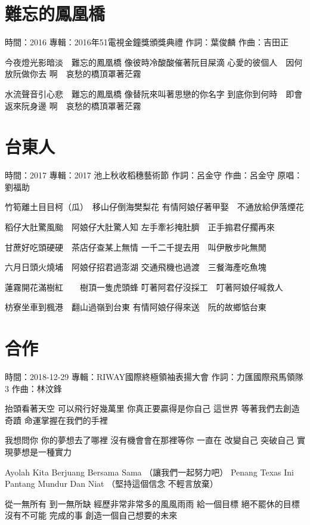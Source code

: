 \documentclass[UTF8,a4paper,oneside,twocolumn,12pt]{ctexbook}
\newcommand{\infopair}[2]{\textbullet #1：#2}
\newcommand{\zc}[1][伍佰]{\infopair{作詞}{#1}}
\newcommand{\zq}[1][伍佰]{\infopair{作曲}{#1}}
\newcommand{\zj}[1]{\infopair{專輯}{#1}}
\newcommand{\yc}[1]{\infopair{原唱}{#1}}
\newcommand{\sj}[1]{\infopair{時間}{#1}}
\newenvironment{info}{\begin{flushleft}\kaishu
	}
	{\end{flushleft}\normalsize\yahei\par}
\newenvironment{lyric}{
	}
{}
\begin{document}
\section{難忘的鳳凰橋}
\begin{info}
	\sj{2016}
	\zj{2016年51電視金鐘獎頒獎典禮}
	\zc[葉俊麟]
	\zq[吉田正]
\end{info}
\begin{lyric}
	今夜燈光影暗淡　難忘的鳳凰橋
	像彼時冷酸酸催著阮目屎滴
	心愛的彼個人　因何放阮做你去
	啊　哀愁的橋頂罩著茫霧

	水流聲音引心悲　難忘的鳳凰橋
	像替阮來叫著思戀的你名字
	到底你到何時　即會返來阮身邊
	啊　哀愁的橋頂罩著茫霧
\end{lyric}

\section{台東人}
\begin{info}
	\sj{2017}
	\zj{2017 池上秋收稻穗藝術節}
	\zc[呂金守]
	\zq[呂金守]
	\yc{劉福助}
\end{info}
\begin{lyric}
	竹筍離土目目柯（瓜）　移山仔倒海樊梨花
	有情阿娘仔著甲娶　不通放給伊落煙花

	稻仔大肚驚風颱　阿娘仔大肚驚人知
	左手牽衫掩肚臍　正手搧君仔擱再來

	甘蔗好吃頭硬硬　茶店仔查某上無情
	一千二千提去用　叫伊散步叱無閒

	六月日頭火燒埔　阿娘仔招君過澎湖
	交通飛機也過渡　三餐海產吃魚塊

	蓮霧開花滿樹紅　　樹頂一隻虎頭蜂
	叮著阿君仔沒採工　叮著阿娘仔喊救人

	枋寮坐車到楓港　翻山過嶺到台東
	有情阿娘仔得來送　阮的故鄉惦台東
\end{lyric}

\section{合作} %
\begin{info}
	\sj{2018-12-29}
	\zj{RIWAY國際終極領袖表揚大會}
	\zc[力匯國際飛馬領隊3]
	\zq[林汶鋒]
\end{info}
\begin{lyric}
	抬頭看著天空 可以飛行好幾萬里
	你真正要贏得是你自己
	這世界 等著我們去創造奇蹟
	命運掌握在我們的手裡

	我想問你 你的夢想去了哪裡
	沒有機會會在那裡等你
	一直在 改變自己 突破自己
	實現夢想是一種實力

	Ayolah Kita Berjuang Bersama Sama
	（讓我們一起努力吧）
	Penang Texas Ini Pantang Mundur Dan Niat
	（堅持這個信念 不輕言放棄）

	從一無所有 到一無所缺
	經歷非常非常多的風風雨雨
	給一個目標 絕不罷休的目標
	沒有不可能 完成的事
	創造一個自己想要的未來
\end{lyric}
\end{document}
